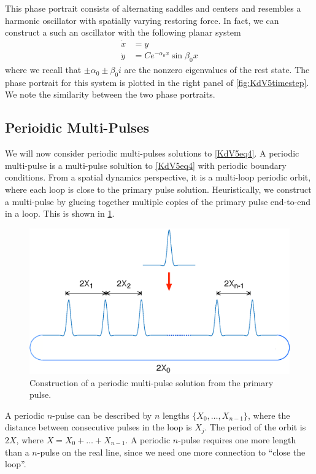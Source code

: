 \documentclass[thesis.tex]{subfiles}
\begin{document}
This phase portrait consists of alternating saddles and centers and resembles a harmonic oscillator with spatially varying restoring force. In fact, we can construct a such an oscillator with the following planar system
\begin{equation}\label{harmonicvary}
\begin{aligned}
\dot{x} &= y \\
\dot{y} &= C e^{-\alpha_0 x} \sin \beta_0 x
\end{aligned}
\end{equation}
where we recall that $\pm \alpha_0 \pm \beta_0 i$ are the nonzero eigenvalues of the rest state. The phase portrait for this system is plotted in the right panel of \cref{fig:KdV5timestep}. We note the similarity between the two phase portraits.

\subsection{Perioidic Multi-Pulses}

We will now consider periodic multi-pulses solutions to \cref{KdV5eq4}. A periodic multi-pulse is a multi-pulse solultion to \cref{KdV5eq4} with periodic boundary conditions. From a spatial dynamics perspective, it is a multi-loop periodic orbit, where each loop is close to the primary pulse solution. Heuristically, we construct a multi-pulse by glueing together multiple copies of the primary pulse end-to-end in a loop. This is shown in \cref{fig:multipulseperiodic}.

\begin{figure}[H]
\includegraphics[width=12cm]{images/kdv5numerics/multipulseperiodic.eps}
\caption{Construction of a periodic multi-pulse solution from the primary pulse.}
\label{fig:multipulseperiodic}
\end{figure}

A periodic $n$-pulse can be described by $n$ lengths $\{X_0, \dots, X_{n-1} \}$, where the distance between consecutive pulses in the loop is $X_j$. The period of the orbit is $2X$, where $X = X_0 + \dots + X_{n-1}$. A periodic $n$-pulse requires one more length than a $n$-pulse on the real line, since we need one more connection to ``close the loop''.
\end{document}
